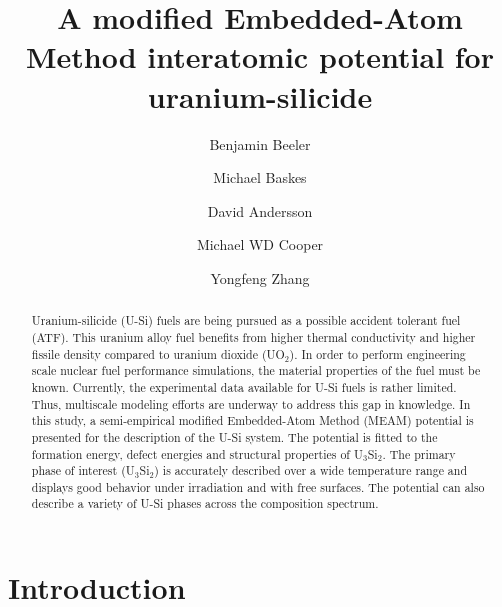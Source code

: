 \documentclass[review]{elsarticle}
\begin{document}
\begin{frontmatter}
\title{A modified Embedded-Atom Method interatomic potential for uranium-silicide}

\author[inl]{Benjamin Beeler}
\author[lanl,ucsd,msu]{Michael Baskes}
\author[lanl]{David Andersson}
\author[lanl]{Michael WD Cooper}
\author[inl]{Yongfeng Zhang}
\address[inl]{Idaho National Laboratory, Idaho Falls, ID 83415}
\address[lanl]{Los Alamos National Laboratory, Los Alamos, NM 87545}
\address[ucsd]{University of California-San Diego, San Diego, CA 92093}
\address[msu]{Mississippi State University, MS 39762}


\begin{abstract}

Uranium-silicide (U-Si) fuels are being pursued as a possible accident tolerant fuel (ATF).  This uranium alloy fuel benefits from higher thermal conductivity and higher fissile density compared to uranium dioxide (UO$_{2}$).  In order to perform engineering scale nuclear fuel performance simulations, the material properties of the fuel must be known.  Currently, the experimental data available for U-Si fuels is rather limited.  Thus, multiscale modeling efforts are underway to address this gap in knowledge.  In this study, a semi-empirical modified Embedded-Atom Method (MEAM) potential is presented for the description of the U-Si system.  The potential is fitted to the formation energy, defect energies and structural properties of U$_{3}$Si$_{2}$. The primary phase of interest (U$_{3}$Si$_{2}$) is accurately described over a wide temperature range and displays good behavior under irradiation and with free surfaces.  The potential can also describe a variety of U-Si phases across the composition spectrum.  

\end{abstract}
\end{frontmatter}

\section{Introduction}
\end{document}
